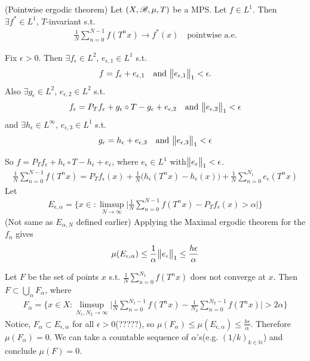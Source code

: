 \documentclass[10pt,a4paper]{report}
\newenvironment{proof}
{\begin{changemargin}{1cm}{0.5cm} 
	}%
	{\end{changemargin}
}
\begin{document}
\thm (Pointwise ergodic theorem) Let $(X,\mathscr{B}, \mu, T)$ be a MPS. Let $f\in L^1$. Then $\exists f^* \in L^1$, $T$-invariant s.t.
\begin{align*}
\frac{1}{N} \sum_{n=0}^{N-1} f(T^n x) \rightarrow f^* (x) \quad \text{pointwise a.e.}
\end{align*}
\begin{proof}
\pf Fix $\epsilon >0$. Then $\exists f_{\epsilon} \in L^2$, $e_{\epsilon, 1} \in L^1$ s.t.
\begin{align*}
f = f_{\epsilon} + e_{\epsilon,1}\quad \text{and } \bigl\lVert e_{\epsilon,1}\bigr\rVert_{1} <\epsilon.
\end{align*}
Also $\exists g_{\epsilon} \in L^2$, $e_{\epsilon,2} \in L^2$ s.t.
\begin{align*}
f_{\epsilon} = P_T f_{\epsilon} + g_{\epsilon} \circ T - g_{\epsilon} + e_{\epsilon,2} \quad \text{and } \bigl\lVert e_{\epsilon,2}\bigr\rVert_{1} <\epsilon
\end{align*}
and $\exists h_{\epsilon} \in L^{\infty}$, $e_{\epsilon,3} \in L^1$ s.t.
\begin{align*}
g_{\epsilon} = h_{\epsilon} + e_{\epsilon,3}\quad \text{and } \bigl\lVert e_{\epsilon,3}\bigr\rVert_{1}<\epsilon
\end{align*}

\quad So $f = P_T f_{\epsilon} + h_{\epsilon}\circ T - h_{\epsilon} + e_{\epsilon}$, where $e_{\epsilon} \in L^1$ with$ \bigl\lVert e_{\epsilon}\bigr\rVert_{1} <\epsilon$.
\begin{align*}
\frac{1}{N} \sum_{n=0}^{N-1} f(T^n x) = P_T f_{\epsilon}(x) + \frac{1}{N} \big( h_{\epsilon}(T^n x) - h_{\epsilon}(x) \big) + \frac{1}{N}\sum_{n=0}^{N_1} e_{\epsilon}(T^n x)
\end{align*}
Let
\begin{align*}
E_{\epsilon,\alpha} = \{ x\in : \limsup_{N\rightarrow \infty} \Big| \frac{1}{N} \sum_{n=0}^{N-1} f(T^n x) - P_T f_{\epsilon}(x) > \alpha  \Big| \}
\end{align*} 
(Not same as $E_{\alpha, N}$ defined earlier)
Applying the Maximal ergodic theorem for the $f_n$ gives
\begin{align*}
\mu(E_{\epsilon,\alpha} ) \leq \frac{1}{\alpha} \bigl\lVert e_{\epsilon}\bigr\rVert_{1} \leq \frac{h\epsilon}{\alpha}
\end{align*}

\quad Let $F$ be the set of points $x$ s.t. $\frac{1}{N} \sum_{n=0}^{N_1} f(T^n x)$ does not converge at $x$. Then $F\subset \bigcup_{\alpha}F_{\alpha}$, where
\begin{align*}
F_{\alpha} = \{x\in X : \limsup_{N_1,N_2 \rightarrow \infty} \Big| \frac{1}{N} \sum_{n=0}^{N_1 -1} f(T^n x) - \frac{1}{N_2} \sum_{n=0}^{N_2 -1} f(T^n x) \Big| >2\alpha  \}
\end{align*}
Notice, $F_{\alpha} \subset E_{\epsilon, \alpha}$ for all $\epsilon>0$(?????), so $\mu(F_{\alpha}) \leq \mu(E_{\epsilon,\alpha}) \leq \frac{h \epsilon}{\alpha}$. Therefore $\mu(F_{\alpha}) =0$. We can take a countable sequence of $\alpha$'s(e.g. $(1/k)_{k\in \mathbb{N}}$) and conclude $\mu(F) = 0$.


\end{proof}
\end{document}
